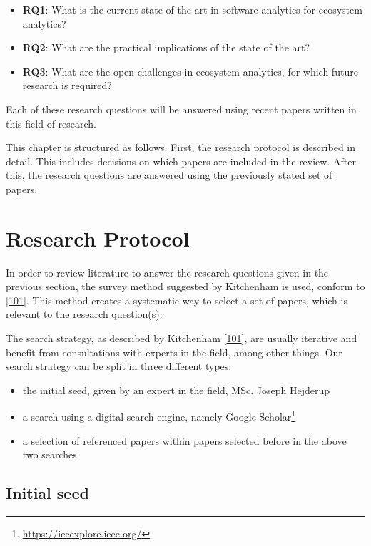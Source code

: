 \documentclass[]{book}
\providecommand{\tightlist}{%
  \setlength{\itemsep}{0pt}\setlength{\parskip}{0pt}}
\let\rmarkdownfootnote\footnote%
\def\footnote{\protect\rmarkdownfootnote}
\begin{document}
\begin{itemize}
\tightlist
\item
  \textbf{RQ1}: What is the current state of the art in software
  analytics for ecosystem analytics?
\item
  \textbf{RQ2}: What are the practical implications of the state of the
  art?
\item
  \textbf{RQ3}: What are the open challenges in ecosystem analytics, for
  which future research is required?
\end{itemize}

Each of these research questions will be answered using recent papers
written in this field of research.

This chapter is structured as follows. First, the research protocol is
described in detail. This includes decisions on which papers are
included in the review. After this, the research questions are answered
using the previously stated set of papers.

\section{Research Protocol}\label{research-protocol-2}

In order to review literature to answer the research questions given in
the previous section, the survey method suggested by Kitchenham is used,
conform to {[}\protect\hyperlink{ref-Kitchenham2004}{101}{]}. This
method creates a systematic way to select a set of papers, which is
relevant to the research question(s).

The search strategy, as described by Kitchenham
{[}\protect\hyperlink{ref-Kitchenham2004}{101}{]}, are usually iterative
and benefit from consultations with experts in the field, among other
things. Our search strategy can be split in three different types:

\begin{itemize}
\tightlist
\item
  the initial seed, given by an expert in the field, MSc. Joseph
  Hejderup
\item
  a search using a digital search engine, namely Google
  Scholar\footnote{\url{https://ieeexplore.ieee.org/}}
\item
  a selection of referenced papers within papers selected before in the
  above two searches
\end{itemize}

\subsection{Initial seed}\label{initial-seed}
\end{document}
